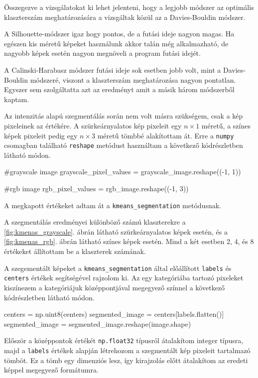 Összegezve a vizsgálatokat ki lehet jelenteni, hogy a legjobb módszer az optimális klaszterszám meghatározására a vizsgáltak közül az a Davies-Bouldin módszer.

A Silhouette-módszer igaz hogy pontos, de a futási ideje nagyon magas. Ha egészen kis méretű képeket használunk akkor talán még alkalmazható, de nagyobb képek esetén nagyon megnöveli a program futási idejét.

A Calinski-Harabasz módszer futási ideje sok esetben jobb volt, mint a Davies-Bouldin módszeré, viszont a klaszterszám meghatározása nagyon pontatlan. Egyszer sem szolgáltatta azt az eredményt amit a másik három módszerből kaptam.

 \label{kmeans_intensity}

Az intenzitás alapú szegmentálás során nem volt másra szükségem, csak a kép pixeleinek az értékére. A szürkeárnyalatos kép pixeleit egy $n\times1$ méretű, a színes képek pixeleit pedig egy $n\times3$ méretű tömbbé alakítottam át. Erre a \texttt{numpy} csomagban található \texttt{reshape} metódust használtam a következő kódrészletben látható módon.
\begin{python}
#grayscale image
grayscale_pixel_values = grayscale_image.reshape((-1, 1))

#rgb image
rgb_pixel_values = rgb_image.reshape((-1, 3))
\end{python}

A megkapott értékeket adtam át a \texttt{kmeans\_segmentation} metódusnak.

A szegmentálás eredményei különböző számú klaszterekre a \ref{fig:kmenas_grayscale}. ábrán látható szürkeárnyalatos képek esetén, és a \ref{fig:kmenas_rgb}. ábrán látható színes képek esetén. Mind a két esetben 2, 4, és 8 értékeket állítottam be a klaszterek számának.

A szegementált képeket a \texttt{kmeans\_segmentation} által előállított \texttt{labels} és \texttt{centers} értékek segítségével rajzolom ki. Az egy kategóriába tartozó pixeleket kiszínezem a kategóriájuk középpontjával megegyező színnel a következő kódrészletben látható módon.

\begin{python}
centers = np.uint8(centers)
segmented_image = centers[labels.flatten()]
segmented_image = segmented_image.reshape(image.shape)
\end{python}

Először a középpontok értékét \texttt{np.float32} típusról átalakítom integer típusra, majd a \texttt{labels} értékek alapján létrehozom a szegmentált kép pixeleit tartalmazó tömböt. Ez a tömb egy dimenziós lesz, így kirajzolás előtt átalakítom az eredeti képpel megegyező formátumra.

